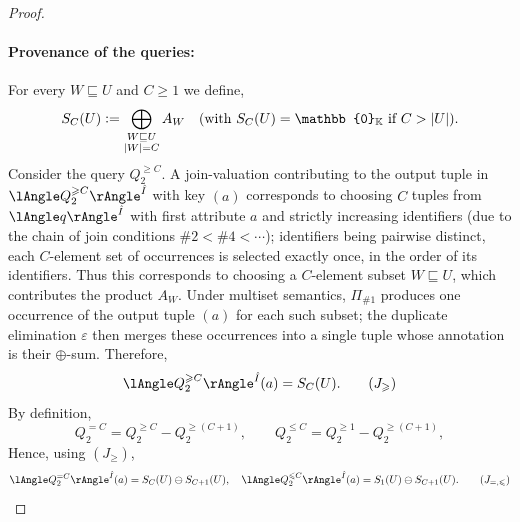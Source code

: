 \begin{proof}
\paragraph*{Provenance of the  queries:}
For every $W\sqsubseteq U $ and $C\ge 1$ we define,
\[
S_C(U)\defeq\bigoplus_{\substack{W\sqsubseteq U \\|W|=C}} A_W
\quad
(\text{with }S_C(U)=\mathbb{0}_\mathbb{K}\text{ if }C>|U|).
\]
Consider the query $Q^{\ge C}_2$.  A join-valuation contributing to the output
tuple in $\angsem{\hat I}{Q^{\ge C}_2}$  with key $(a)$ corresponds to choosing $C$ tuples from $\angsem{\hat I}{q}$ with first
attribute $a$ and strictly increasing identifiers (due to the chain of
join conditions $\#2<\#4<\cdots$); identifiers being pairwise distinct,
each $C$-element set of occurrences is selected exactly once, in the order
of its identifiers. Thus this corresponds to choosing a
$C$-element subset $W\sqsubseteq U$, which contributes the product $A_W$.
Under multiset semantics, $\Pi_{\#1}$ produces one occurrence of the output tuple $(a)$ for each such subset; the duplicate elimination $\varepsilon$ then merges these occurrences into a single tuple whose annotation is their $\oplus$-sum.
Therefore,
\[
\angsem{\hat I}{Q^{\ge C}_2}(a)
=S_C(U).
\tag{$J_{\ge}$}
\]
By definition,
\[
Q^{=C}_2 = Q^{\ge C}_2 - Q^{\ge (C+1)}_2,
\qquad
Q^{\le C}_2 = Q^{\ge 1}_2 - Q^{\ge (C+1)}_2,
\]
Hence, using $(J_{\ge})$,
\[
\angsem{\hat I}{Q^{=C}_2}(a)
=
S_C(U) \ominus S_{C+1}(U),
\quad
\angsem{\hat I}{Q^{\le C}_2}(a)
=
S_1(U) \ominus S_{C+1}(U).
\tag{$J_{=,\le}$}
\]

\end{proof}
